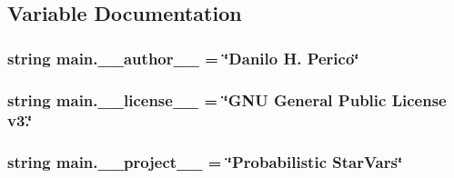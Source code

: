 \subsection{Variable Documentation}
\hypertarget{namespacemain_a5e2661c5c42dc197ee8e68887453d3bc}{
\subsubsection[{\-\_\-\-\_\-author\-\_\-\-\_\-}]{\setlength{\rightskip}{0pt plus 5cm}string main.\-\_\-\-\_\-author\-\_\-\-\_\- = \char`\"{}Danilo H. Perico\char`\"{}}}\label{namespacemain_a5e2661c5c42dc197ee8e68887453d3bc}
\hypertarget{namespacemain_a70420639202607ff61f0a08061e04e47}{
\subsubsection[{\-\_\-\-\_\-license\-\_\-\-\_\-}]{\setlength{\rightskip}{0pt plus 5cm}string main.\-\_\-\-\_\-license\-\_\-\-\_\- = \char`\"{}G\-N\-U General Public License v3.\char`\"{}}}\label{namespacemain_a70420639202607ff61f0a08061e04e47}
\hypertarget{namespacemain_afb7b6dcaed6631460aa4089c3b178748}{
\subsubsection[{\-\_\-\-\_\-project\-\_\-\-\_\-}]{\setlength{\rightskip}{0pt plus 5cm}string main.\-\_\-\-\_\-project\-\_\-\-\_\- = \char`\"{}Probabilistic {\bf Star\-Vars}\char`\"{}}}\label{namespacemain_afb7b6dcaed6631460aa4089c3b178748}
